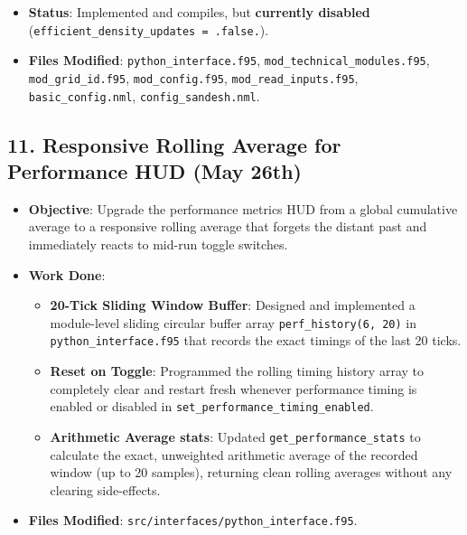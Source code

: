 \begin{itemize}
\begin{itemize}
\item \textbf{Config Flag}: Gated behind \texttt{efficient\_density\_updates} (boolean) in the namelist. Currently set to \texttt{.false.} in both \texttt{basic\_config.nml} and \texttt{config\_sandesh.nml} pending validation that it does not affect simulation accuracy.
\end{itemize}
\item \textbf{Status}: Implemented and compiles, but \textbf{currently disabled} (\texttt{efficient\_density\_updates = .false.}).
\item \textbf{Files Modified}: \texttt{python\_interface.f95}, \texttt{mod\_technical\_modules.f95}, \texttt{mod\_grid\_id.f95}, \texttt{mod\_config.f95}, \texttt{mod\_read\_inputs.f95}, \texttt{basic\_config.nml}, \texttt{config\_sandesh.nml}.
\end{itemize}

\subsection{11. Responsive Rolling Average for Performance HUD (May 26th)}
\begin{itemize}
\item \textbf{Objective}: Upgrade the performance metrics HUD from a global cumulative average to a responsive rolling average that forgets the distant past and immediately reacts to mid-run toggle switches.
\item \textbf{Work Done}:
\begin{itemize}
\item \textbf{20-Tick Sliding Window Buffer}: Designed and implemented a module-level sliding circular buffer array \texttt{perf\_history(6, 20)} in \texttt{python\_interface.f95} that records the exact timings of the last 20 ticks.
\item \textbf{Reset on Toggle}: Programmed the rolling timing history array to completely clear and restart fresh whenever performance timing is enabled or disabled in \texttt{set\_performance\_timing\_enabled}.
\item \textbf{Arithmetic Average stats}: Updated \texttt{get\_performance\_stats} to calculate the exact, unweighted arithmetic average of the recorded window (up to 20 samples), returning clean rolling averages without any clearing side-effects.
\end{itemize}
\item \textbf{Files Modified}: \texttt{src/interfaces/python\_interface.f95}.
\end{itemize}

